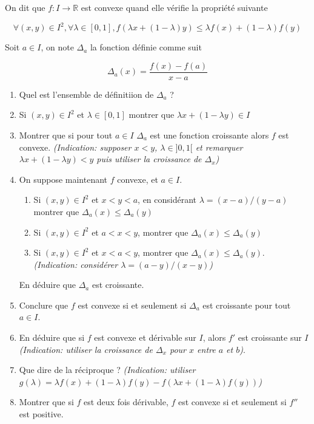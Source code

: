 \documentclass{article}
\newcommand{\mb}[1]{\mathbb{#1}}
\begin{document}
On dit que $f : I \to \mb{R}$ est convexe quand elle vérifie 
la propriété suivante

\begin{equation*}
    \forall (x,y) \in I^2, \forall \lambda \in [0,1], 
    f(\lambda x + (1-\lambda)y) \leq \lambda f(x) + (1-\lambda) f(y)
\end{equation*}

Soit $a \in I$, on note $\Delta_a$ la fonction définie comme suit

\begin{equation*}
    \Delta_a (x) = \frac{f(x) - f(a)}{x - a}
\end{equation*}

\begin{enumerate}
    \item Quel est l'ensemble de définitiion de $\Delta_a$ ?
    \item Si $(x,y) \in I^2$ et $\lambda \in [0,1]$ 
        montrer que $\lambda x + (1 - \lambda y) \in I$
    \item Montrer que si pour tout $a \in I$ $\Delta_a$ 
        est une fonction croissante alors $f$ est convexe.
        \emph{(Indication: supposer $x < y$, $\lambda \in ]0,1[$ 
            et remarquer 
            $\lambda x + (1 - \lambda y) < y$
            puis utiliser la croissance de $\Delta_x$)}
    
    \item On suppose maintenant $f$ convexe, et $a \in I$.
        \begin{enumerate}
            \item Si $(x,y) \in I^2$ et $x < y < a$, en considérant 
                $\lambda = (x - a) / (y-a)$ montrer que 
                $\Delta_a (x) \leq \Delta_a (y)$

            \item Si $(x,y) \in I^2$ et $a < x < y$, montrer que 
                $\Delta_a(x) \leq \Delta_a (y)$

            \item Si $(x,y) \in I^2$ et $x < a < y$, montrer 
                que $\Delta_a (x) \leq \Delta_a (y)$. 
                \emph{(Indication: considérer $\lambda = (a - y)/(x-y)$)}
        \end{enumerate}
        En déduire que $\Delta_a$ est croissante.
    \item Conclure que $f$ est convexe si et seulement si $\Delta_a$ est 
        croissante pour tout $a \in I$.
   
    \item En déduire que si $f$ est convexe et dérivable sur $I$, alors $f'$ 
        est croissante sur $I$ \emph{(Indication: utiliser la croissance de $\Delta_x$ 
        pour $x$ entre $a$ et $b$)}.

    \item Que dire de la réciproque ? \emph{(Indication: utiliser 
            $g(\lambda) = \lambda f(x) + (1 - \lambda)f(y) - f (\lambda x +
            (1-\lambda) f (y))$)}

    \item Montrer que si $f$ est deux fois dérivable, $f$ est convexe 
        si et seulement si $f''$ est positive.
\end{enumerate}
\end{document}

